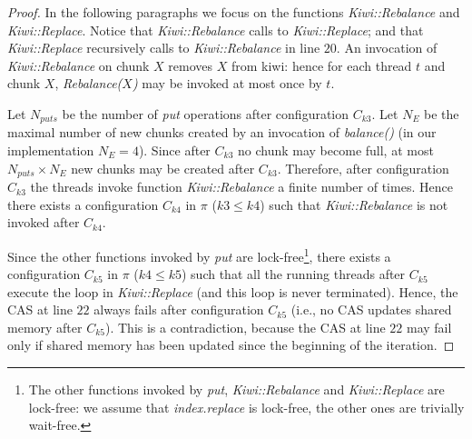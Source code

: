 \begin{proof}
In the following paragraphs we focus on the functions \emph{Kiwi::Rebalance} and \emph{Kiwi::Replace}.
Notice that \emph{Kiwi::Rebalance} calls to \emph{Kiwi::Replace}; and that \emph{Kiwi::Replace} recursively calls to \emph{Kiwi::Rebalance} in line $20$.
An invocation of \emph{Kiwi::Rebalance} on chunk $X$ removes $X$ from kiwi:
hence for each thread $t$ and chunk $X$, \emph{Rebalance($X$)} may be invoked at most once by $t$.

Let $N_{puts}$ be the number of \emph{put} operations after configuration $C_{k3}$.
Let $N_E$ be the maximal number of new chunks created by an invocation of \emph{balance()} (in our implementation $N_E=4$).
Since after $C_{k3}$ no chunk may become full, at most $N_{puts} \times N_E$ new chunks may be created after $C_{k3}$.
Therefore, after configuration $C_{k3}$ the threads invoke function  \emph{Kiwi::Rebalance} a finite number of times.
Hence there exists a configuration $C_{k4}$ in $\pi$ ($k3 \leq k4$) such that \emph{Kiwi::Rebalance} is not invoked after $C_{k4}$.





Since the other functions invoked by \emph{put} are lock-free\footnote{
The other functions invoked by \emph{put}, \emph{Kiwi::Rebalance} and \emph{Kiwi::Replace} are lock-free:
we assume that \emph{index.replace} is lock-free, the other ones are trivially wait-free.},
there exists a configuration $C_{k5}$ in $\pi$ ($k4 \leq k5$) such that all the running threads
after $C_{k5}$ execute the loop in \emph{Kiwi::Replace} (and this loop is never terminated).
%
Hence, the CAS at line $22$ always fails after configuration $C_{k5}$ (i.e., no CAS updates shared memory after $C_{k5}$).
This is a contradiction, because the  CAS at line $22$ may fail only if shared memory has been updated since the beginning of the iteration.



%
%
%

\end{proof}



